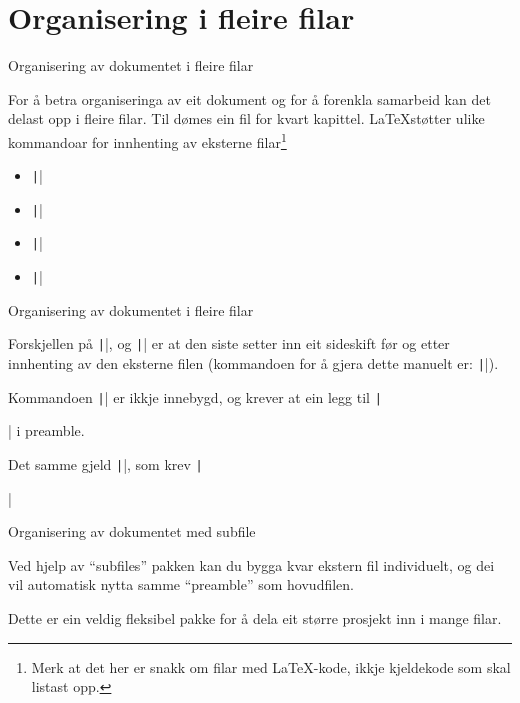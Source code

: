 
\section{Organisering i fleire filar}

	\begin{frame}{Organisering av dokumentet i fleire filar}
	
	For å betra organiseringa av eit dokument og for å forenkla samarbeid kan det delast opp i fleire filar. Til dømes ein fil for kvart kapittel. \LaTeX støtter ulike kommandoar for innhenting av eksterne filar\footnote{Merk at det her er snakk om filar med \LaTeX-kode, ikkje kjeldekode som skal listast opp.}
	
	\begin{itemize}
		\item \texttt||
		\item \texttt||
		\item \texttt||
		\item \texttt||
	\end{itemize}
	
\end{frame}

\begin{frame}{Organisering av dokumentet i fleire filar}
	
	Forskjellen på \texttt||, og \texttt|| er at den siste setter inn eit sideskift før og etter innhenting av den eksterne filen (kommandoen for å gjera dette manuelt er: \texttt|\clearpage|).
	
	Kommandoen \texttt|| er ikkje innebygd, og krever at ein legg til \texttt|\usepackage{import}| i preamble.
	
	Det samme gjeld \texttt||, som krev \texttt|\usepackage{subfiles}|
	
	
\end{frame}

\begin{frame}{Organisering av dokumentet med subfile}
	
	Ved hjelp av ``subfiles'' pakken kan du bygga kvar ekstern fil individuelt, og dei vil automatisk nytta samme ``preamble'' som hovudfilen.
	
	Dette er ein veldig fleksibel pakke for å dela eit større prosjekt inn i mange filar.
	
\end{frame}